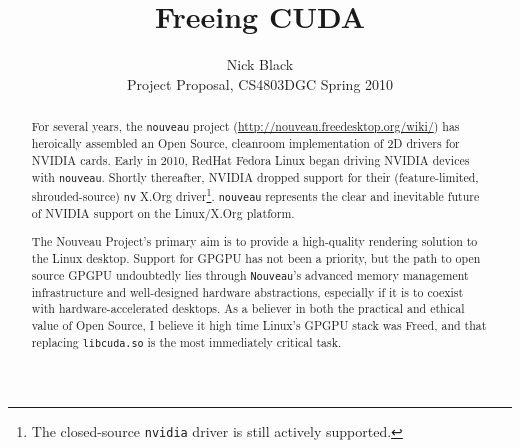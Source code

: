 \documentclass[letterpaper,10pt]{article}
\title{Freeing CUDA}
\author{Nick Black\\
Project Proposal, CS4803DGC Spring 2010}
\date{}
\begin{document}
\maketitle

\begin{abstract}
For several years, the \texttt{nouveau} project (\url{http://nouveau.freedesktop.org/wiki/})
has heroically assembled an Open Source, cleanroom implementation of 2D drivers for
NVIDIA cards\cite{nouveaustatus}. Early in 2010, RedHat Fedora Linux began driving
NVIDIA devices with \texttt{nouveau}. Shortly thereafter, NVIDIA dropped
support for their (feature-limited, shrouded-source) \texttt{nv} X.Org driver\footnote{The
closed-source \texttt{nvidia} driver is still actively supported.}. \texttt{nouveau} represents
the clear and inevitable future of NVIDIA support on the Linux/X.Org platform.

The Nouveau Project's primary aim is to provide a high-quality rendering
solution to the Linux desktop. Support for GPGPU has not been a priority, but
the path to open source GPGPU undoubtedly lies through
\texttt{Nouveau}'s advanced memory management infrastructure and well-designed hardware
abstractions, especially if it is to coexist with hardware-accelerated desktops.
As a believer in both the practical and ethical value of Open Source, I believe
it high time Linux's GPGPU stack was Freed, and that replacing \texttt{libcuda.so}
is the most immediately critical task.
\end{abstract}
\end{document}
